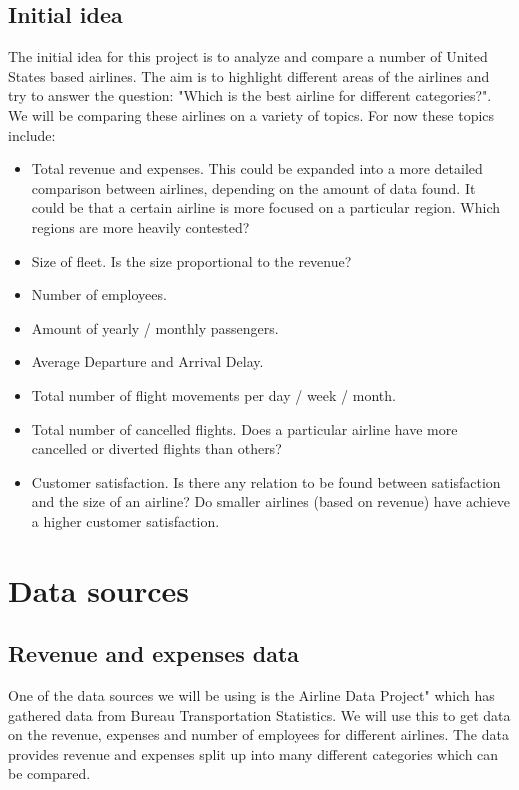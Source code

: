 \documentclass[11pt,oneside]{book}
\begin{document}
\section*{Initial idea}
The initial idea for this project is to analyze and compare a number of United States based airlines. The aim is to highlight different areas of the airlines and try to answer the question: "Which is the best airline for different categories?". 
We will be comparing these airlines on a variety of topics. For now these topics include: 
\begin{itemize}
	\item Total revenue and expenses. This could be expanded into a more detailed comparison between airlines, depending on the amount of data found. It could be that a certain airline is more focused on a particular region. Which regions are more heavily contested? 
	\item Size of fleet. Is the size proportional to the revenue?
	\item Number of employees.
	\item Amount of yearly / monthly passengers.
	\item Average Departure and Arrival Delay. 
	\item Total number of flight movements per day / week / month.
	\item Total number of cancelled flights. Does a particular airline have more cancelled or diverted flights than others?
	\item Customer satisfaction. Is there any relation to be found between satisfaction and the size of an airline? Do smaller airlines (based on revenue) have achieve a higher customer satisfaction.

\end{itemize}

\chapter{Data sources}
\section*{Revenue and expenses data}
One of the data sources we will be using is the Airline Data Project" \cite{adp} which has gathered data from Bureau Transportation Statistics\cite{bts}. We will use this to get data on the revenue, expenses and number of employees for different airlines. The data provides revenue and expenses split up into many different categories which can be compared.\\
\end{document}
